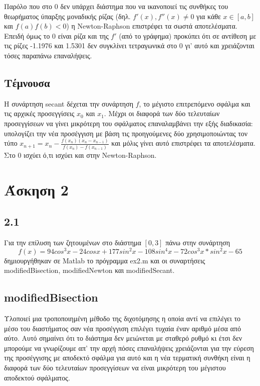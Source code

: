 \documentclass[a4paper,11pt]{article}
\begin{document}
\begin{flushleft}
Παρόλο που στο 0 δεν υπάρχει διάστημα που να ικανοποιεί τις συνθήκες του θεωρήματος ύπαρξης μοναδικής ρίζας (δηλ. $f'(x),f''(x)\neq0$ για κάθε $x\in[a,b]$ και $f(a)f(b)<0$) η Newton-Raphson επιστρέφει τα σωστά αποτελέσματα.
Επειδή όμως το 0 είναι ρίζα και της $f'$ (από το γράφημα) προκύπει ότι σε αντίθεση με τις ρίζες -1.1976 και 1.5301 δεν συγκλίνει τετραγωνικά στο 0 γι' αυτό και χρειάζονται τόσες παραπάνω επαναλήψεις.
\linebreak

\subsection*{Τέμνουσα}
Η συνάρτηση secant δέχεται την συνάρτηση $f$, το μέγιστο επιτρεπόμενο σφάλμα και τις αρχικές προσεγγίσεις $x_0$ και $x_1$. Μέχρι οι διαφορά των δύο τελευταίων προσεγγίσεων να γίνει μικρότερη του σφάλματος επαναλαμβάνει την εξής διαδικασία: υπολογίζει την νέα προσέγγιση με βάση τις προηγούμενες δύο χρησιμοποιώντας τον τύπο $x_{n+1} = x_n-\frac{f(x_n)(x_n-x_{n-1})}{f(x_n)-f(x_{n-1})}$ και μόλις γίνει αυτό επιστρέφει τα αποτελέσματα. 
\linebreak
Στο 0 ισχύει ό,τι ισχύει και στην Newton-Raphson.
\pagebreak

\section*{Άσκηση 2}
\subsection*{2.1}
Για την επίλυση των ζητουμένων στο διάστημα $[0,3]$ πάνω στην συνάρτηση $$f(x) = 94cos^3x-24cosx+177sin^2x-108sin^4x-72cos^3x*sin^2x-65$$  δημιουργήθηκαν σε Matlab το πρόγραμμα ex2.m και οι συναρτήσεις modifiedBisection, modifiedNewton και modifiedSecant.

\subsection*{modifiedBisection}
 Υλοποιεί μια τροποποιημένη μέθοδο της διχοτόμησης η οποία αντί να επιλέγει το μέσο του διαστήματος σαν νέα προσέγγιση επιλέγει τυχαία έναν αριθμό μέσα από αύτο. Αυτό σημαίνει ότι το διάστημα δεν μειώνεται με σταθερό ρυθμό κι έτσι δεν μπορούμε να γνωρίζουμε απ' την αρχή πόσες επαναλήψεις χρειάζονται για την εύρεση της προσέγγισης με αποδεκτό σφάλμα για αυτό και η νέα τερματική συνθήκη είναι η διαφορά των δύο τελευταίων προσεγγίσεων να είναι μικρότερη του μέγιστου αποδεκτού σφάλματος.
\linebreak



\end{flushleft}
\end{document}
